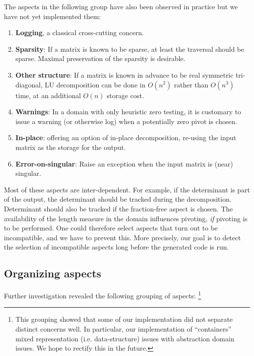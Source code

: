 \documentclass{elsart}
\begin{document}
The aspects in the following group have also been observed in
practice but we have not yet implemented them:
\begin{enumerate}
\setcounter{enumi}{\value{naspects}}
\item \textbf{Logging}, a classical cross-cutting concern.
\item \textbf{Sparsity}: If a matrix is known to be sparse, at least
the traversal should be sparse. Maximal preservation of the sparsity
is desirable. 
\item \textbf{Other structure}: If a matrix is known in
advance to be real symmetric tri-diagonal, LU decomposition can be
done in $O(n^2)$ rather than $O(n^3)$ time, at an additional $O(n)$
storage cost.
\item \textbf{Warnings}: In a domain with only heuristic zero
testing, it is customary to issue a warning (or otherwise log) when 
a potentially zero pivot is chosen.
\item \textbf{In-place}: offering an option of in-place decomposition,
  re-using the input matrix as the storage for the output.
\item \textbf{Error-on-singular}: Raise an exception when the input
  matrix is (near) singular.
\setcounter{naspects}{\value{enumi}}
\end {enumerate}

Most of these aspects are inter-dependent. For example, if the
determinant is part of the output, the determinant should be
tracked during the decomposition. Determinant should also be tracked
if the fraction-free aspect is chosen. The availability of the length
measure in the domain influences pivoting, \emph{if} pivoting
is to be performed. One could therefore select aspects that turn out
to be incompatible, and we have to prevent this. 
More precisely, our goal is to detect the selection of
incompatible aspects long before the generated code is run.

\subsection{Organizing aspects}\label{sec:aspect-groups}

Further investigation revealed the following grouping of aspects:%
\footnote{This grouping showed that some of our implementation did not
separate distinct concerns well. In
particular, our implementation of ``containers'' 
mixed representation (i.e. data-structure) issues with abstraction
domain issues.  We hope to rectify this in the future.}
\end{document}
